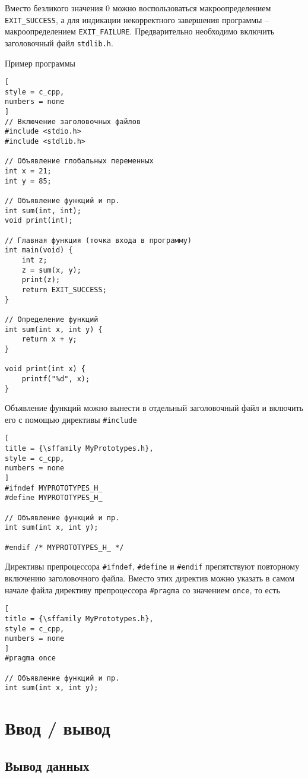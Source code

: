 \documentclass[%
	11pt,
	a4paper,
	utf8,
		]{article}
\begin{document}
Вместо безликого значения 0 можно воспользоваться макроопределением \verb|EXIT_SUCCESS|, а для индикации некорректного завершения программы -- макроопределением \verb|EXIT_FAILURE|. Предварительно необходимо включить заголовочный файл \verb|stdlib.h|.

Пример программы
\begin{lstlisting}[
style = c_cpp,
numbers = none
]
// Включение заголовочных файлов
#include <stdio.h>
#include <stdlib.h>

// Объявление глобальных переменных
int x = 21;
int y = 85;

// Объявление функций и пр.
int sum(int, int);
void print(int);

// Главная функция (точка входа в программу)
int main(void) {
    int z;
    z = sum(x, y);
    print(z);
    return EXIT_SUCCESS;
}

// Определение функций
int sum(int x, int y) {
    return x + y;
}

void print(int x) {
    printf("%d", x);
}
\end{lstlisting}

Объявление функций можно вынести в отдельный заголовочный файл и включить его с помощью директивы \verb|#include|
\begin{lstlisting}[
title = {\sffamily MyPrototypes.h},
style = c_cpp,
numbers = none
]
#ifndef MYPROTOTYPES_H_
#define MYPROTOTYPES_H_

// Объявление функций и пр.
int sum(int x, int y);

#endif /* MYPROTOTYPES_H_ */
\end{lstlisting}

Директивы препроцессора \verb|#ifndef|, \verb|#define| и \verb|#endif| препятствуют повторному включению заголовочного файла. Вместо этих директив можно указать в самом начале файла директиву препроцессора \verb|#pragma| со значением \verb|once|, то есть
\begin{lstlisting}[
title = {\sffamily MyPrototypes.h},
style = c_cpp,
numbers = none
]
#pragma once

// Объявление функций и пр.
int sum(int x, int y);
\end{lstlisting}

\section{Ввод / вывод}

\subsection{Вывод данных}
\end{document}
